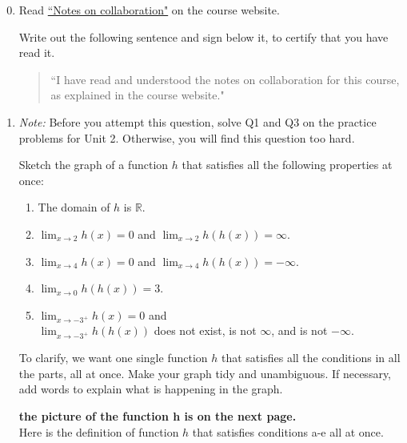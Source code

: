 \documentclass[12pt]{exam}
\newcommand {\DS} [1] {${\displaystyle #1}$}
\newcommand{\vv}{\vspace{.2cm}}
\newcommand{\R}{\mathbb{R}}
\begin{document}
\begin{enumerate}

\setcounter{enumi}{-1}

\item Read \href{https://www.math.toronto.edu/~alfonso/137/PS/137_2021_collaboration.pdf}{``Notes on collaboration"} on the course website.

	Write out the following sentence and sign below it, to certify that you have read it.
	
	\begin{quote}
		``I have read and understood the notes on collaboration for this course, as explained in the course website."
	\end{quote}

\vv

\newpage

\item \emph{Note:} Before you attempt this question, solve Q1 and Q3 on the practice problems for Unit 2.  Otherwise, you will find this question too hard.

  Sketch the graph of a function $h$ that satisfies all the following properties at once:
	\begin{enumerate}
		\item The domain of $h$ is $\R$.
		\item  \DS{\lim_{x \to 2} h(x) = 0} \; and \; \DS{\lim_{x \to 2} h(h(x)) = \infty}.
		\item  \DS{\lim_{x \to 4} h(x) = 0} \; and \; \DS{\lim_{x \to 4} h(h(x)) = - \infty}.
		\item \DS{\lim_{x \to 0} h(h(x))=3}.
		\item  \DS{\lim_{x \to -3^+} h(x) = 0} \; and \\
		   \DS{\lim_{x \to -3^+} h(h(x))} does not exist, is not $\infty$, and is not $-\infty$.
	\end{enumerate}
	To clarify, we want one single function $h$ that satisfies all the conditions in all the parts, all at once.  Make your graph tidy and unambiguous.  If necessary, add words to explain what is happening in the graph.  
\vv

\textbf{the picture of the function h is on the next page.}\\
Here is the definition of function $h$ that satisfies conditions a-e all at once.\\

\vv


\end{enumerate}
\end{document}
